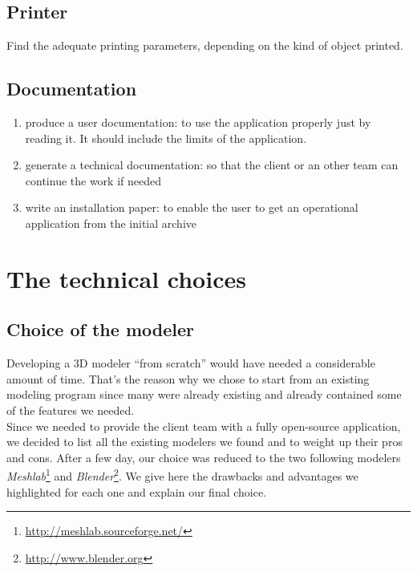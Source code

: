 \documentclass{report}
\begin{document}
\subsection{Printer}

Find the adequate printing parameters, depending on the kind of object printed.

\subsection{Documentation}

\begin{enumerate}
\item produce a user documentation: to use the application properly just by reading it. It should include the limits of the application.
\item generate a technical documentation: so that the client or an other team can continue the work if needed
\item write an installation paper: to enable the user to get an operational application from the initial archive
\end{enumerate}



\section{The technical choices}

\subsection{Choice of the modeler}

Developing a 3D modeler ``from scratch'' would have needed a considerable amount of time. That's the reason why we chose to start from an existing modeling program since many were already existing and already contained some of the features we needed.\\

Since we needed to provide the client team with a fully open-source application, we decided to list all the existing modelers we found and to weight up their pros and cons. After a few day, our choice was reduced to the two following modelers \emph{Meshlab}\footnote{\url{http://meshlab.sourceforge.net/}} and \emph{Blender}\footnote{\url{http://www.blender.org}}. We give here the drawbacks and advantages we highlighted for each one and explain our final choice.

\bigskip
\end{document}

